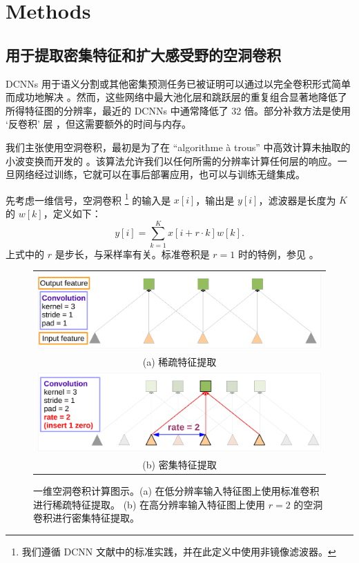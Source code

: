 \section{Methods}
\label{sec:methods}

\subsection{用于提取密集特征和扩大感受野的空洞卷积}
\label{sec:convnet-hole}

DCNNs 用于语义分割或其他密集预测任务已被证明可以通过以完全卷积形式简单而成功地解决 \cite{sermanet2013overfeat, long2014fully}。然而，这些网络中最大池化层和跳跃层的重复组合显著地降低了所得特征图的分辨率，最近的 DCNNs 中通常降低了 32 倍。部分补救方法是使用 `反卷积' 层 \cite{long2014fully}，但这需要额外的时间与内存。 

我们主张使用空洞卷积，最初是为了在 ``algorithme \`a trous'' 中高效计算未抽取的小波变换而开发的 \cite{holschneider1989real, giusti2013fast, sermanet2013overfeat, papandreou2014untangling}。该算法允许我们以任何所需的分辨率计算任何层的响应。一旦网络经过训练，它就可以在事后部署应用，也可以与训练无缝集成。

先考虑一维信号，空洞卷积 \footnote{我们遵循 DCNN 文献中的标准实践，并在此定义中使用非镜像滤波器。} 的输入是 $x[i]$，输出是 $y[i]$，滤波器是长度为 $K$ 的 $w[k]$，定义如下：
\begin{equation}
  y[i] = \sum_{k=1}^K x[i + r \cdot k] w[k].
\end{equation}
上式中的 $r$ 是步长，与采样率有关。标准卷积是 $r=1$ 时的特例，参见 。

\begin{figure}
  \begin{tabular}{c}
    \includegraphics[width=0.9\linewidth]{fig/atrous_fig1.pdf} \\
    {\scriptsize (a) 稀疏特征提取} \\
    \includegraphics[width=0.9\linewidth]{fig/atrous_fig2.pdf} \\
    {\scriptsize (b) 密集特征提取} \\
  \end{tabular}
  \caption{一维空洞卷积计算图示。(a) 在低分辨率输入特征图上使用标准卷积进行稀疏特征提取。
    (b) 在高分辨率输入特征图上使用 $r=2$ 的空洞卷积进行密集特征提取。}
  \label{fig:hole}
\end{figure}

